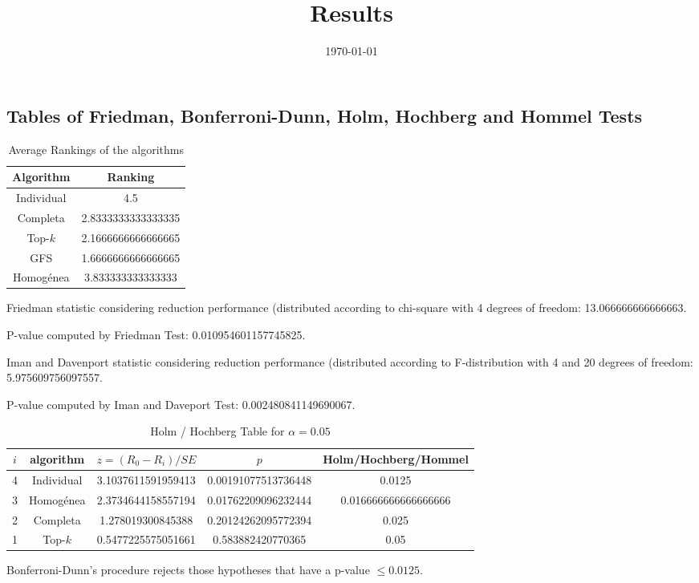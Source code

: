 \documentclass[a4paper,10pt]{article}
\title{Results}
\author{}
\date{\today}
\begin{document}
\begin{landscape}
\oddsidemargin 0in \topmargin 0in\maketitle
\section{Tables of Friedman, Bonferroni-Dunn, Holm, Hochberg and Hommel Tests}
\begin{table}[!htp]
\centering
\caption{Average Rankings of the algorithms
}\begin{tabular}{c|c}
Algorithm&Ranking\\
\hline
Individual&4.5\\
Completa&2.8333333333333335\\
Top-$k$&2.1666666666666665\\
GFS&1.6666666666666665\\
Homogénea&3.833333333333333\\
\end{tabular}
\end{table}


Friedman statistic considering reduction performance (distributed according to chi-square with 4 degrees of freedom: 13.066666666666663.


P-value computed by Friedman Test: 0.010954601157745825.\newline

Iman and Davenport statistic considering reduction performance (distributed according to F-distribution with 4 and 20 degrees of freedom: 5.975609756097557.


P-value computed by Iman and Daveport Test: 0.002480841149690067.\newline

\begin{table}[!htp]
\centering\tiny
\caption{Holm / Hochberg Table for $\alpha=0.05$}
\begin{tabular}{ccccc}
$i$&algorithm&$z=(R_0 - R_i)/SE$&$p$&Holm/Hochberg/Hommel\\
\hline
4&Individual&3.1037611591959413&0.00191077513736448&0.0125\\
3&Homogénea&2.3734644158557194&0.01762209096232444&0.016666666666666666\\
2&Completa&1.278019300845388&0.20124262095772394&0.025\\
1&Top-$k$&0.5477225575051661&0.583882420770365&0.05\\
\hline
\end{tabular}
\end{table}
Bonferroni-Dunn's procedure rejects those hypotheses that have a p-value $\le0.0125$.



\end{landscape}
\end{document}
